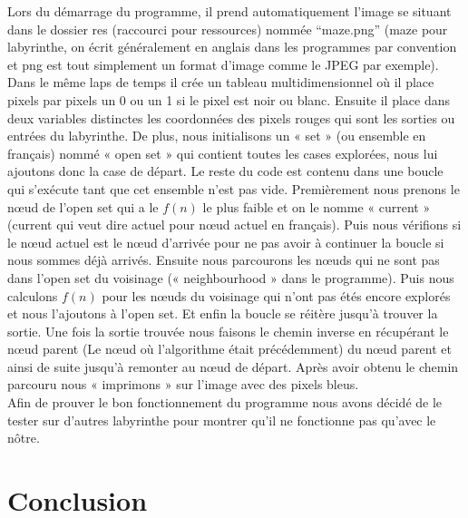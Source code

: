 \documentclass[]{report}
\theoremstyle{definition}
\begin{document}
{Lors du démarrage du programme, il prend automatiquement l’image se situant dans le dossier res (raccourci pour ressources) nommée “maze.png” (maze pour labyrinthe, on écrit généralement en anglais dans les programmes par convention et png est tout simplement un format d’image comme le JPEG par exemple). Dans le même laps de temps il crée un tableau multidimensionnel où il place pixels par pixels un 0 ou un 1 si le pixel est noir ou blanc. Ensuite il place dans deux variables distinctes les coordonnées des pixels rouges qui sont les sorties ou entrées du labyrinthe. 
De plus, nous initialisons  un « set » (ou ensemble en français) nommé « open set » qui contient toutes les cases explorées, nous lui ajoutons donc la case de départ. Le reste du code est contenu dans une boucle qui s’exécute tant que cet ensemble n’est pas vide. 
Premièrement nous prenons le nœud de l’open set qui a le \(f(n)\) le plus faible et on le nomme « current » (current qui veut dire actuel pour nœud actuel en français). Puis nous vérifions si le nœud actuel est le nœud d’arrivée pour ne pas avoir à continuer la boucle si nous sommes déjà arrivés. Ensuite nous parcourons les nœuds qui ne sont pas dans l’open set du voisinage (« neighbourhood » dans le programme). Puis nous calculons \(f(n)\) pour les nœuds du voisinage qui n’ont pas étés encore explorés et nous l’ajoutons à l’open set. Et enfin la boucle se réitère jusqu’à trouver la sortie. Une fois la sortie trouvée nous faisons le chemin inverse en récupérant le nœud parent (Le nœud où l’algorithme était précédemment) du nœud parent et ainsi de suite jusqu’à remonter au nœud de départ. Après avoir obtenu le chemin parcouru nous « imprimons » sur l’image avec des pixels bleus.}\\
{Afin de prouver le bon fonctionnement du programme nous avons décidé de le tester sur d’autres labyrinthe pour montrer qu’il ne fonctionne pas qu’avec le nôtre. }

\section*{Conclusion}
\end{document}
